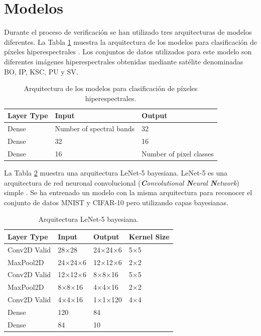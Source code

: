 \section{Modelos}

Durante el proceso de verificación se han utilizado tres arquitecturas de modelos diferentes. La Tabla \ref{tab:hyper_models} muestra la arquitectura de los modelos para clasificación de píxeles hiperespectrales \cite{bnn_hyper_uncertainty}. Los conjuntos de datos utilizados para este modelo son diferentes imágenes hiperespectrales obtenidas mediante satélite denominadas BO, IP, KSC, PU y SV.


\begin{table}[h]
    \centering
    \caption{Arquitectura de los modelos para clasificación de píxeles hiperespectrales.}
    \label{tab:hyper_models}
    \begin{tabular}{lll}
    \hline
         \textbf{Layer Type} & \textbf{Input} & \textbf{Output}\\ \hline
         Dense & Number of spectral bands & 32\\
         Dense & 32 & 16\\
         Dense & 16 & Number of pixel classes\\ \hline
    \end{tabular}
\end{table}

La Tabla \ref{tab:cnn_models} muestra una arquitectura LeNet-5 bayesiana. LeNet-5 es una arquitectura de red neuronal convolucional (\textit{\textbf{C}onvolutional \textbf{N}eural \textbf{N}etwork}) simple \cite{lenet}. Se ha entrenado un modelo con la misma arquitectura para reconocer el conjunto de datos MNIST \cite{MNIST_dataset} y CIFAR-10 \cite{CIFAR_dataset} pero utilizando capas bayesianas.

\begin{table}[h]
    \centering
    \caption{Arquitectura LeNet-5 bayesiana.}
    \label{tab:cnn_models}
    \begin{tabular}{llll}
        \hline
         \textbf{Layer Type} &  \textbf{Input} &  \textbf{Output} & \textbf{Kernel Size} \\ \hline
         Conv2D Valid & 28$\times$28 & 24$\times$24$\times$6 & 5$\times$5 \\
         MaxPool2D & 24$\times$24$\times$6 & 12$\times$12$\times$6 & 2$\times$2 \\
         Conv2D Valid & 12$\times$12$\times$6 & 8$\times$8$\times$16 & 5$\times$5 \\
         MaxPool2D & 8$\times$8$\times$16 & 4$\times$4$\times$16 & 2$\times$2 \\
         Conv2D Valid & 4$\times$4$\times$16 & 1$\times$1$\times$120 & 4$\times$4 \\
         Dense & 120 & 84 & \\
         Dense & 84 & 10 & \\ \hline
    \end{tabular}
\end{table}

